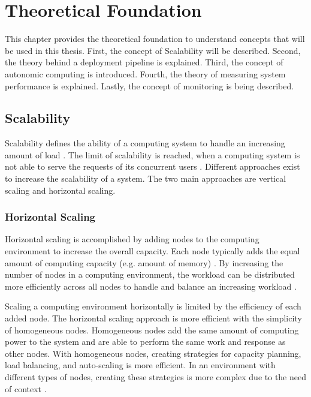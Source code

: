 \chapter{Theoretical Foundation}
\label{chap:02_foundation}


This chapter provides the theoretical foundation to understand concepts that will be used in this thesis. First, the concept of Scalability will be described. Second, the theory behind a deployment pipeline is explained. Third, the concept of autonomic computing is  introduced. Fourth, the theory of measuring system performance is explained. Lastly, the concept of monitoring is being described.


\section{Scalability}
\label{sec:02_foundations_scalability}
Scalability defines the ability of a computing system to handle an increasing amount of load \cite{Farcic2017Toolkit21}. 
The limit of scalability is reached, when a computing system is not able to serve the requests of its concurrent users \cite{Wilder2012CloudPatterns}.
Different approaches exist to increase the scalability of a system. The two main approaches are vertical scaling and horizontal scaling.


\subsection{Horizontal Scaling}
Horizontal scaling is accomplished by adding nodes to the computing environment to increase the overall capacity.
Each node typically adds the equal amount of computing capacity (e.g. amount of memory) \cite{Wilder2012CloudPatterns}.
By increasing the number of nodes in a computing environment, the workload can be distributed more efficiently across all nodes to handle and balance an increasing workload \cite{Wilder2012CloudPatterns, Abbott2015ScalabilityArt}.


Scaling a computing environment horizontally is limited by the efficiency of each added node.
The horizontal scaling approach is more efficient with the simplicity of homogeneous nodes.
Homogeneous nodes add the same amount of computing power to the system and are able to perform the same work and response as other nodes.
With homogeneous nodes, creating strategies for capacity planning, load balancing, and auto-scaling is more efficient.
In an environment with different types of nodes, creating these strategies is more complex due to the need of context \cite{Wilder2012CloudPatterns}.


